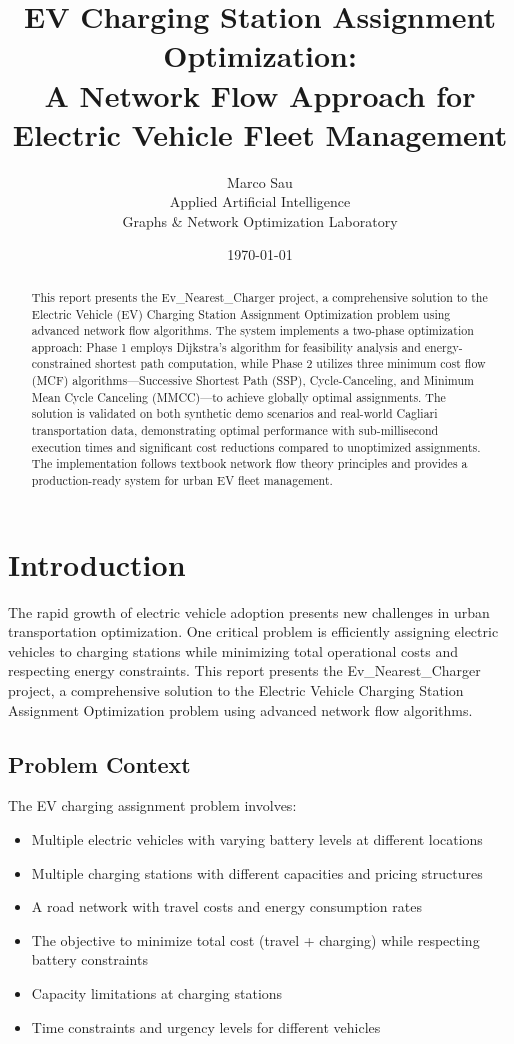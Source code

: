 \documentclass[12pt,a4paper]{article}
\title{\textbf{EV Charging Station Assignment Optimization:\\A Network Flow Approach for Electric Vehicle Fleet Management}}
\author{Marco Sau\\Applied Artificial Intelligence\\Graphs \& Network Optimization Laboratory}
\date{\today}
\begin{document}
\maketitle

\begin{abstract}
This report presents the Ev\_Nearest\_Charger project, a comprehensive solution to the Electric Vehicle (EV) Charging Station Assignment Optimization problem using advanced network flow algorithms. The system implements a two-phase optimization approach: Phase 1 employs Dijkstra's algorithm for feasibility analysis and energy-constrained shortest path computation, while Phase 2 utilizes three minimum cost flow (MCF) algorithms—Successive Shortest Path (SSP), Cycle-Canceling, and Minimum Mean Cycle Canceling (MMCC)—to achieve globally optimal assignments. The solution is validated on both synthetic demo scenarios and real-world Cagliari transportation data, demonstrating optimal performance with sub-millisecond execution times and significant cost reductions compared to unoptimized assignments. The implementation follows textbook network flow theory principles and provides a production-ready system for urban EV fleet management.
\end{abstract}

\tableofcontents
\newpage

\section{Introduction}

The rapid growth of electric vehicle adoption presents new challenges in urban transportation optimization. One critical problem is efficiently assigning electric vehicles to charging stations while minimizing total operational costs and respecting energy constraints. This report presents the Ev\_Nearest\_Charger project, a comprehensive solution to the Electric Vehicle Charging Station Assignment Optimization problem using advanced network flow algorithms.

\subsection{Problem Context}

The EV charging assignment problem involves:
\begin{itemize}
    \item Multiple electric vehicles with varying battery levels at different locations
    \item Multiple charging stations with different capacities and pricing structures
    \item A road network with travel costs and energy consumption rates
    \item The objective to minimize total cost (travel + charging) while respecting battery constraints
    \item Capacity limitations at charging stations
    \item Time constraints and urgency levels for different vehicles
\end{itemize}
\end{document}
